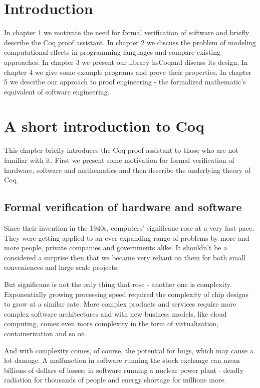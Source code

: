 \documentclass[declaration,inz,english,shortabstract]{iithesis}
\author         {Zeimer}
\date           {czerwiec 2019}                     %
\newcommand{\libname}{hsCoq}
\begin{document}

\chapter{Introduction}

In chapter 1 we motivate the need for formal verification of software and briefly describe the Coq proof assistant. In chapter 2 we discuss the problem of modeling computational effects in programming languages and compare existing approaches. In chapter 3 we present our library \libname and discuss its design. In chapter 4 we give some example programs and prove their properties. In chapter 5 we describe our approach to proof engineering - the formalized mathematic's equivalent of software engineering.

\chapter{A short introduction to Coq}

This chapter briefly introduces the Coq proof assistant to those who are not familiar with it. First we present some motivation for formal verification of hardware, software and mathematics and then describe the underlying theory of Coq.

\section{Formal verification of hardware and software}

Since their invention in the 1940s, computers' significane rose at a very fast pace. They were getting applied to an ever expanding range of problems by more and more people, private companies and governments alike. It shouldn't be a considered a surprise then that we became very reliant on them for both small conveniences and large scale projects.

But significane is not the only thing that rose - another one is complexity. Exponentially growing processing speed required the complexity of chip designs to grow at a similar rate. More complex products and services require more complex software architectures and with new business models, like cloud computing, comes even more complexity in the form of virtualization, containerization and so on.

And with complexity comes, of course, the potential for bugs, which may cause a lot damage. A malfunction in software running the stock exchange can mean billions of dollars of losses; in software running a nuclear power plant - deadly radiation for thousands of people and energy shortage for millions more.
\end{document}

